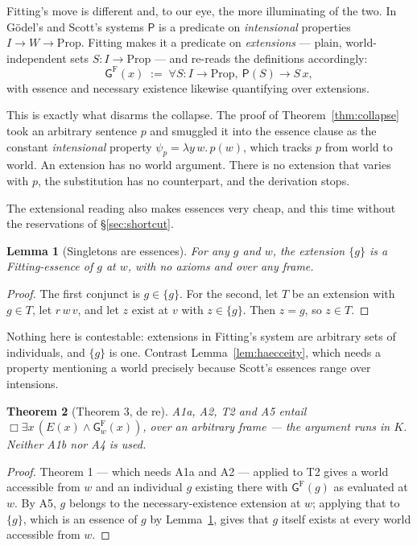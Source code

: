 \documentclass[11pt]{article}
\theoremstyle{plain}
\newtheorem{theorem}{Theorem}
\newtheorem{lemma}[theorem]{Lemma}
\theoremstyle{definition}
\newcommand{\Prp}{\mathrm{Prop}}
\newcommand{\Gd}{\mathsf{G}}
\newcommand{\Pos}{\mathsf{P}}
\begin{document}
Fitting's move is different and, to our eye, the more illuminating of the two.
In G\"odel's and Scott's systems $\Pos$ is a predicate on \emph{intensional}
properties $I \to W \to \Prp$. Fitting makes it a predicate on
\emph{extensions} --- plain, world-independent sets $S : I \to \Prp$ --- and
re-reads the definitions accordingly:
\[
  \Gd^{\mathrm{F}}(x) \;:=\; \forall S : I \to \Prp,\ \Pos(S) \to S\,x,
\]
with essence and necessary existence likewise quantifying over extensions.

This is exactly what disarms the collapse. The proof of
Theorem~\ref{thm:collapse} took an arbitrary sentence $p$ and smuggled it into
the essence clause as the constant \emph{intensional} property
$\psi_p = \lambda y\,w.\,p(w)$, which tracks $p$ from world to world. An
extension has no world argument. There is no extension that varies with $p$,
the substitution has no counterpart, and the derivation stops.

The extensional reading also makes essences very cheap, and this time without
the reservations of \S\ref{sec:shortcut}.

\begin{lemma}[Singletons are essences]\label{lem:singleton}
For any $g$ and $w$, the extension $\{g\}$ is a Fitting-essence of $g$ at $w$,
with no axioms and over any frame.
\end{lemma}

\begin{proof}
The first conjunct is $g \in \{g\}$. For the second, let $T$ be an extension
with $g \in T$, let $r\,w\,v$, and let $z$ exist at $v$ with $z \in \{g\}$.
Then $z = g$, so $z \in T$.
\end{proof}

\noindent
Nothing here is contestable: extensions in Fitting's system are arbitrary sets
of individuals, and $\{g\}$ is one. Contrast Lemma~\ref{lem:haecceity}, which
needs a property mentioning a world precisely because Scott's essences range
over intensions.

\begin{theorem}[Theorem 3, de re]\label{thm:fitT3}
A1a, A2, T2 and A5 entail $\Box\exists x\,(E(x) \wedge \Gd^{\mathrm{F}}_w(x))$,
\emph{over an arbitrary frame} --- the argument runs in $K$. Neither A1b nor
A4 is used.
\end{theorem}

\begin{proof}
Theorem 1 --- which needs A1a and A2 --- applied to T2 gives a world accessible
from $w$ and an individual $g$ existing there with $\Gd^{\mathrm{F}}(g)$ as
evaluated at $w$. By A5, $g$ belongs to the necessary-existence extension at
$w$; applying that to $\{g\}$, which is an essence of $g$ by
Lemma~\ref{lem:singleton}, gives that $g$ itself exists at every world
accessible from $w$.
\end{proof}
\end{document}
